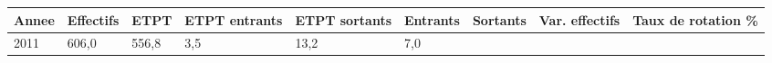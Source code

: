 \begin{longtable}[]{@{}lllllllll@{}}
\toprule
\begin{minipage}[b]{0.05\columnwidth}\raggedright
Annee\strut
\end{minipage} & \begin{minipage}[b]{0.08\columnwidth}\raggedright
Effectifs\strut
\end{minipage} & \begin{minipage}[b]{0.05\columnwidth}\raggedright
ETPT\strut
\end{minipage} & \begin{minipage}[b]{0.10\columnwidth}\raggedright
ETPT entrants\strut
\end{minipage} & \begin{minipage}[b]{0.10\columnwidth}\raggedright
ETPT sortants\strut
\end{minipage} & \begin{minipage}[b]{0.07\columnwidth}\raggedright
Entrants\strut
\end{minipage} & \begin{minipage}[b]{0.07\columnwidth}\raggedright
Sortants\strut
\end{minipage} & \begin{minipage}[b]{0.11\columnwidth}\raggedright
Var. effectifs\strut
\end{minipage} & \begin{minipage}[b]{0.14\columnwidth}\raggedright
Taux de rotation \%\strut
\end{minipage}\tabularnewline
\midrule
\endhead
\begin{minipage}[t]{0.05\columnwidth}\raggedright
2011\strut
\end{minipage} & \begin{minipage}[t]{0.08\columnwidth}\raggedright
606,0\strut
\end{minipage} & \begin{minipage}[t]{0.05\columnwidth}\raggedright
556,8\strut
\end{minipage} & \begin{minipage}[t]{0.10\columnwidth}\raggedright
3,5\strut
\end{minipage} & \begin{minipage}[t]{0.10\columnwidth}\raggedright
13,2\strut
\end{minipage} & \begin{minipage}[t]{0.07\columnwidth}\raggedright
7,0\strut
\end{minipage} & \begin{minipage}[t]{0.07\columnwidth}\raggedright

\end{minipage}
\end{longtable}
